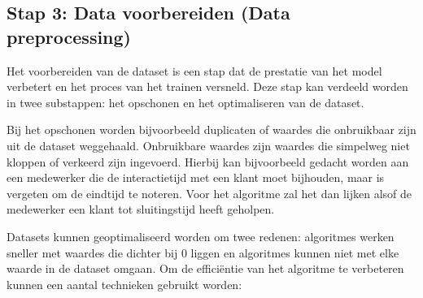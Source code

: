


\subsection{Stap 3: Data voorbereiden (Data preprocessing)}\label{subsec:ch4-data-voorbereiden}
Het voorbereiden van de dataset is een stap dat de prestatie van het model verbetert en het proces van het trainen versneld. Deze stap kan verdeeld worden in twee substappen: het opschonen en het optimaliseren van de dataset.

Bij het opschonen worden bijvoorbeeld duplicaten of waardes die onbruikbaar zijn uit de dataset weggehaald. Onbruikbare waardes zijn waardes die simpelweg niet kloppen of verkeerd zijn ingevoerd. Hierbij kan bijvoorbeeld gedacht worden aan een medewerker die de interactietijd met een klant moet bijhouden, maar is vergeten om de eindtijd te noteren. Voor het algoritme zal het dan lijken alsof de medewerker een klant tot sluitingstijd heeft geholpen.

Datasets kunnen geoptimaliseerd worden om twee redenen: algoritmes werken sneller met waardes die dichter bij \(0\) liggen en algoritmes kunnen niet met elke waarde in de dataset omgaan. Om de efficiëntie van het algoritme te verbeteren kunnen een aantal technieken gebruikt worden:

